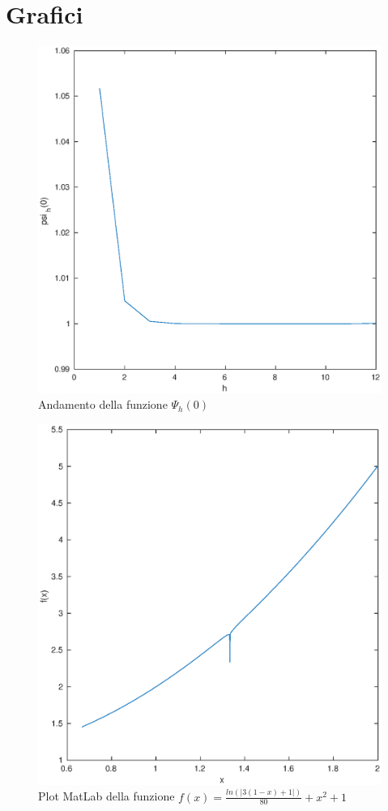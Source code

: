 \section{\textbf{Grafici}}
\begin{figure}[h]
\label{fes14}
\includegraphics[width=\textwidth]{plot/fes14}
\caption{Andamento della funzione $\Psi_{h}(0)$}
\end{figure}
\begin{figure}[h]
\label{fes113}
\includegraphics[width=\textwidth]{plot/fes113}
\caption{Plot MatLab della funzione $f(x)=\frac{ln(|3(1-x)+1|)}{80}+x^2+1$}
\end{figure}
